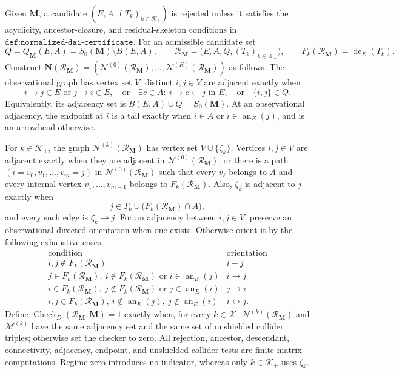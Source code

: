 Given \(\mathbf M\), a candidate \((E,A,(T_k)_{k\in\mathcal K_+})\) is rejected unless it satisfies the acyclicity, ancestor-closure, and residual-skeleton conditions in \(\texttt{def:normalized-dai-certificate}\).  For an admissible candidate set
\[
Q=Q_{\mathbf M}(E,A)=S_0(\mathbf M)\setminus B(E,A),
\qquad
\mathcal R_{\mathbf M}=\bigl(E,A,Q,(T_k)_{k\in\mathcal K_+}\bigr),
\qquad
F_k(\mathcal R_{\mathbf M})=\operatorname{de}_E(T_k).
\]
Construct \(\mathbf N(\mathcal R_{\mathbf M})=(\mathcal N^{(0)}(\mathcal R_{\mathbf M}),\ldots,\mathcal N^{(K)}(\mathcal R_{\mathbf M}))\) as follows.  The observational graph has vertex set \(V\); distinct \(i,j\in V\) are adjacent exactly when
\[
i\to j\in E\text{ or }j\to i\in E,
\quad\text{or}\quad
\exists c\in A:\ i\to c\leftarrow j\text{ in }E,
\quad\text{or}\quad
\{i,j\}\in Q.
\]
Equivalently, its adjacency set is \(B(E,A)\cup Q=S_0(\mathbf M)\).  At an observational adjacency, the endpoint at \(i\) is a tail exactly when \(i\in A\) or \(i\in\operatorname{an}_E(j)\), and is an arrowhead otherwise.

For \(k\in\mathcal K_+\), the graph \(\mathcal N^{(k)}(\mathcal R_{\mathbf M})\) has vertex set \(V\cup\{\zeta_k\}\).  Vertices \(i,j\in V\) are adjacent exactly when they are adjacent in \(\mathcal N^{(0)}(\mathcal R_{\mathbf M})\), or there is a path \((i=v_0,v_1,\ldots,v_m=j)\) in \(\mathcal N^{(0)}(\mathcal R_{\mathbf M})\) such that every \(v_\ell\) belongs to \(A\) and every internal vertex \(v_1,\ldots,v_{m-1}\) belongs to \(F_k(\mathcal R_{\mathbf M})\).  Also, \(\zeta_k\) is adjacent to \(j\) exactly when
\[
j\in T_k\cup\bigl(F_k(\mathcal R_{\mathbf M})\cap A\bigr),
\]
and every such edge is \(\zeta_k\to j\).  For an adjacency between \(i,j\in V\), preserve an observational directed orientation when one exists.  Otherwise orient it by the following exhaustive cases:
\[
\begin{array}{c|c}
\text{condition}&\text{orientation}\\ \hline
i,j\notin F_k(\mathcal R_{\mathbf M})&i\mathbin{-}j\\
j\in F_k(\mathcal R_{\mathbf M}),\ i\notin F_k(\mathcal R_{\mathbf M})\text{ or }i\in\operatorname{an}_E(j)&i\to j\\
i\in F_k(\mathcal R_{\mathbf M}),\ j\notin F_k(\mathcal R_{\mathbf M})\text{ or }j\in\operatorname{an}_E(i)&j\to i\\
i,j\in F_k(\mathcal R_{\mathbf M}),\ i\notin\operatorname{an}_E(j),\ j\notin\operatorname{an}_E(i)&i\leftrightarrow j.
\end{array}
\]
Define \(\operatorname{Check}_{D}(\mathcal R_{\mathbf M},\mathbf M)=1\) exactly when, for every \(k\in\mathcal K\), \(\mathcal N^{(k)}(\mathcal R_{\mathbf M})\) and \(\mathcal M^{(k)}\) have the same adjacency set and the same set of unshielded collider triples; otherwise set the checker to zero.  All rejection, ancestor, descendant, connectivity, adjacency, endpoint, and unshielded-collider tests are finite matrix computations.  Regime zero introduces no indicator, whereas only \(k\in\mathcal K_+\) uses \(\zeta_k\).